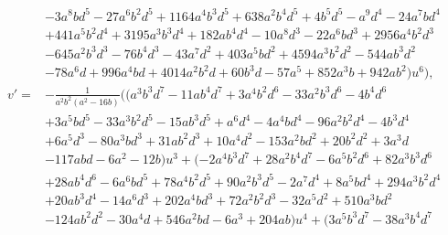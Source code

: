 \documentclass{gtpart}
\theoremstyle{definition}
\theoremstyle{remark}
\begin{document}
\begin{equation*}
\begin{split}
      & - 3 a^8 b d^5 - 27 a^6 b^2 d^5 + 1164 a^4 b^3 d^5 + 638 a^2 b^4 d^5 + 4 b^5 d^5 - a^9 d^4 - 24 a^7 b d^4 \\
      & + 441 a^5 b^2 d^4 + 3195 a^3 b^3 d^4 + 182 a b^4 d^4 - 10 a^8 d^3 - 22 a^6 b d^3 + 2956 a^4 b^2 d^3 \\
      & - 645 a^2 b^3 d^3 - 76 b^4 d^3 - 43 a^7 d^2 + 403 a^5 b d^2 + 4594 a^3 b^2 d^2 - 544 a b^3 d^2 \\
      & - 78 a^6 d + 996 a^4 b d + 4014 a^2 b^2 d + 60 b^3 d - 57 a^5 + 852 a^3 b + 942 a b^2) u^6 \big), \\
 v' = & -\frac{1}{a^2 b^2 (a^2 - 16 b)} \big( (a^3 b^3 d^7 - 11 a b^4 d^7 + 3 a^4 b^2 d^6 - 33 a^2 b^3 d^6 - 4 b^4 d^6 \\
      & + 3 a^5 b d^5 - 33 a^3 b^2 d^5 - 15 a b^3 d^5 + a^6 d^4 - 4 a^4 b d^4 - 96 a^2 b^2 d^4 - 4 b^3 d^4 \\
      & + 6 a^5 d^3 - 80 a^3 b d^3 + 31 a b^2 d^3 + 10 a^4 d^2 - 153 a^2 b d^2 + 20 b^2 d^2 + 3 a^3 d \\
      & - 117 a b d - 6 a^2 - 12 b) u^3 + (-2 a^4 b^3 d^7 + 28 a^2 b^4 d^7 - 6 a^5 b^2 d^6 + 82 a^3 b^3 d^6 \\
      & + 28 a b^4 d^6 - 6 a^6 b d^5 + 78 a^4 b^2 d^5 + 90 a^2 b^3 d^5 - 2 a^7 d^4 + 8 a^5 b d^4 + 294 a^3 b^2 d^4 \\
      & + 20 a b^3 d^4 - 14 a^6 d^3 + 202 a^4 b d^3 + 72 a^2 b^2 d^3 - 32 a^5 d^2 + 510 a^3 b d^2 \\
      & - 124 a b^2 d^2 - 30 a^4 d + 546 a^2 b d - 6 a^3 + 204 a b) u^4 + (3 a^5 b^3 d^7 - 38 a^3 b^4 d^7 
\end{split}
\end{equation*}
\end{document}
